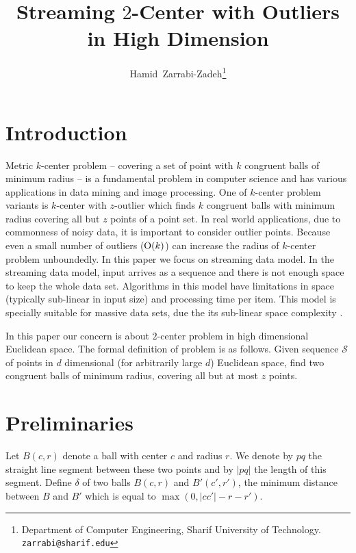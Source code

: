 \documentclass[envcountsame]{cls/cccg15}
\title{Streaming $2$-Center with Outliers in High Dimension}
\author{Hamid~Zarrabi-Zadeh\thanks{Department of Computer Engineering, 
	Sharif University of Technology. 
	{\tt zarrabi@sharif.edu}}
	\and 
}
\newcommand{\cO}{\ensuremath{{\rm O}}}
\newcommand{\card}[1]{\left|{#1}\right|}
\begin{document}
\maketitle
\pagestyle{plain}


\begin{abstract}

\end{abstract}


\section{Introduction}
Metric $k$-center problem -- covering a set of point with $k$ congruent balls of minimum radius -- is a fundamental problem in computer science and has various applications in data mining and image processing.
One of $k$-center problem variants is $k$-center with $z$-outlier which finds $k$ congruent balls with minimum radius covering all but $z$ points of a point set. In real world applications, due to commonness of noisy data, it is important to consider outlier points. Because even a small number of outliers ($\cO(k)$) can increase the radius of $k$-center problem unboundedly.
In this paper we focus on streaming data model. In the streaming data model, input arrives as a sequence and there is not enough space to keep the whole data set. Algorithms in this model have limitations in space (typically sub-linear in input size) and processing time per item. This model is specially suitable for massive data sets, due the its sub-linear space complexity \cite{aggarwal2007data}.

In this paper our concern is about $2$-center problem in high dimensional Euclidean space.
The formal definition of problem is as follows. Given sequence $\mathcal{S}$ of points in $d$ dimensional (for arbitrarily large $d$) Euclidean space, find two congruent balls of minimum radius, covering all but at most $z$ points.



\section{Preliminaries}
\label{sec:pre}
Let $B(c,r)$ denote a ball with center $c$ and radius $r$. We denote by $pq$ the straight line segment between these two points and by $\card{pq}$ the length of this segment. 
Define $\delta$ of two balls $B(c,r)$ and $B'(c',r')$, the minimum distance between $B$ and $B'$ which is equal to $\max (0, \card{cc'}-r-r')$.
\end{document}
